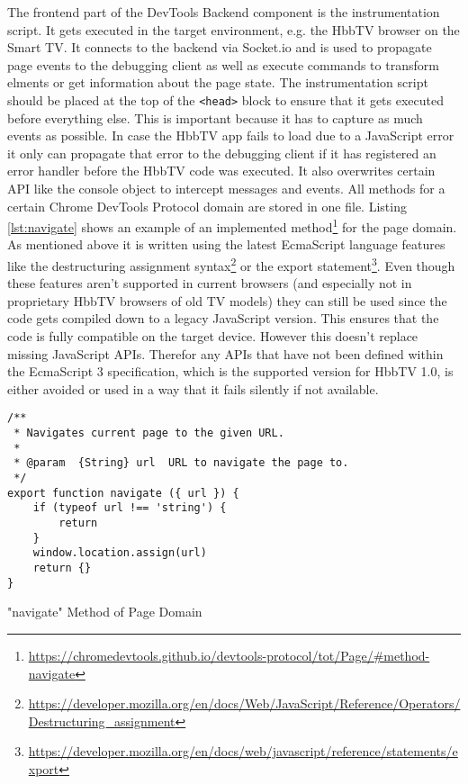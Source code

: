The frontend part of the DevTools Backend component is the instrumentation script. It gets executed
in the target environment, e.g. the HbbTV browser on the Smart TV. It connects to the backend via
Socket.io and is used to propagate page events to the debugging client as well as execute commands
to transform elments or get information about the page state. The instrumentation script should be
placed at the top of the \texttt{<head>} block to ensure that it gets executed before everything
else. This is important because it has to capture as much events as possible. In case the HbbTV app
fails to load due to a JavaScript error it only can propagate that error to the debugging client if
it has registered an error handler before the HbbTV code was executed. It also overwrites certain API
like the console object to intercept messages and events. All methods for a certain Chrome DevTools
Protocol domain are stored in one file. Listing \ref{lst:navigate} shows an example of an implemented
method\footnote{\url{https://chromedevtools.github.io/devtools-protocol/tot/Page/\#method-navigate}}
for the page domain. As mentioned above it is written using the latest EcmaScript language features
like the destructuring assignment syntax\footnote{\url{https://developer.mozilla.org/en/docs/Web/JavaScript/Reference/Operators/Destructuring_assignment}}
or the export statement\footnote{\url{https://developer.mozilla.org/en/docs/web/javascript/reference/statements/export}}.
Even though these features aren't supported in current browsers (and especially not in proprietary
HbbTV browsers of old TV models) they can still be used since the code gets compiled down to a legacy
JavaScript version. This ensures that the code is fully compatible on the target device. However this
doesn't replace missing JavaScript APIs. Therefor any APIs that have not been defined within the
EcmaScript 3 specification, which is the supported version for HbbTV 1.0, is either avoided or used
in a way that it fails silently if not available.

\begin{listing}[H]
\begin{verbatim}
/**
 * Navigates current page to the given URL.
 *
 * @param  {String} url  URL to navigate the page to.
 */
export function navigate ({ url }) {
    if (typeof url !== 'string') {
        return
    }
    window.location.assign(url)
    return {}
}
\end{verbatim}
\caption{"navigate" Method of Page Domain}
\label{lst:navigate}
\end{listing}

